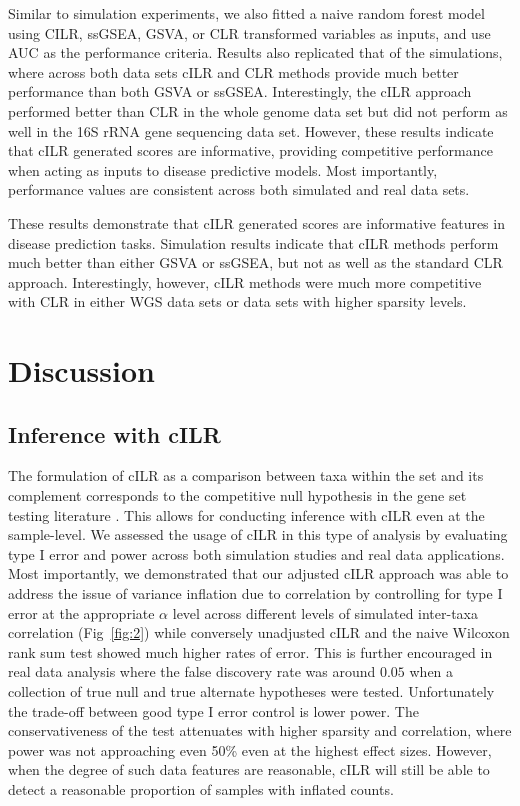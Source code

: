 \documentclass[10pt,letterpaper]{article}
\begin{document}
Similar to simulation experiments, we also fitted a naive random forest model using CILR, ssGSEA, GSVA, or CLR transformed variables as inputs, and use AUC as the performance criteria. Results also replicated that of the simulations, where across both data sets cILR and CLR methods provide much better performance than both GSVA or ssGSEA. Interestingly, the cILR approach performed better than CLR in the whole genome data set but did not perform as well in the 16S rRNA gene sequencing data set. However, these results indicate that cILR generated scores are informative, providing competitive performance when acting as inputs to disease predictive models. Most importantly, performance values are consistent across both simulated and real data sets. 

These results demonstrate that cILR generated scores are informative features in disease prediction tasks. Simulation results indicate that cILR methods perform much better than either GSVA or ssGSEA, but not as well as the standard CLR approach. Interestingly, however, cILR methods were much more competitive with CLR in either WGS data sets or data sets with higher sparsity levels. 


\section*{Discussion}

\subsection*{Inference with cILR}
The formulation of cILR as a comparison between taxa within the set and its complement corresponds to the competitive null hypothesis in the gene set testing literature \cite{tian2005}. This allows for conducting inference with cILR even at the sample-level. We assessed the usage of cILR in this type of analysis by evaluating type I error and power across both simulation studies and real data applications. Most importantly, we demonstrated that our adjusted cILR approach was able to address the issue of variance inflation due to correlation \cite{wu2012} by controlling for type I error at the appropriate $\alpha$ level across different levels of simulated inter-taxa correlation (Fig~\ref{fig:2}) while conversely unadjusted cILR and the naive Wilcoxon rank sum test showed much higher rates of error. This is further encouraged in real data analysis where the false discovery rate was around $0.05$ when a collection of true null and true alternate hypotheses were tested. Unfortunately the trade-off between good type I error control is lower power. The conservativeness of the test attenuates with higher sparsity and correlation, where power was not approaching even 50\% even at the highest effect sizes. However, when the degree of such data features are reasonable, cILR will still be able to detect a reasonable proportion of samples with inflated counts.  
\end{document}
